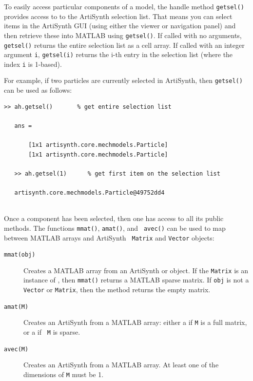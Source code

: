 \documentclass{article}
\begin{document}
To easily access particular components of a model, the handle method
{\tt getsel()} provides access to to the ArtiSynth selection
list. That means you can select items in the ArtiSynth GUI (using
either the viewer or navigation panel) and then retrieve these into
MATLAB using {\tt getsel()}. If called with no arguments, {\tt
getsel()} returns the entire selection list as a cell array.  If
called with an integer argument {\tt i}, {\tt getsel(i)} returns the
i-th entry in the selection list (where the index {\tt i} is 1-based).

For example, if two particles are currently selected in ArtiSynth, then
{\tt getsel()} can be used as follows:
%
\begin{lstlisting}[]
   >> ah.getsel()       % get entire selection list
   
   ans = 

       [1x1 artisynth.core.mechmodels.Particle]
       [1x1 artisynth.core.mechmodels.Particle]

   >> ah.getsel(1)      % get first item on the selection list

   artisynth.core.mechmodels.Particle@49752dd4
   
\end{lstlisting}
%
Once a component has been selected, then one has access to all its
public methods. The functions {\tt mmat()}, {\tt amat()}, and {\tt
avec()} can be used to map between MATLAB arrays and ArtiSynth {\tt
Matrix} and {\tt Vector} objects:

\begin{description}

\item[{\tt mmat(obj)} ] \mbox{}

Creates a MATLAB array from an ArtiSynth 
 or 
object. If the {\tt Matrix} is an instance of 
, then
{\tt mmat()} returns a MATLAB sparse matrix. If {\tt obj} is not a
{\tt Vector} or {\tt Matrix}, then the method returns the empty
matrix.

\item[{\tt amat(M)} ] \mbox{}

Creates an ArtiSynth  from a MATLAB
array: either a  if {\tt M} is a
full matrix, or a  if {\tt
M} is sparse.

\item[{\tt avec(M)} ] \mbox{}

Creates an ArtiSynth  from a
MATLAB array. At least one of the dimensions of {\tt M} must be 1.

\end{description}
\end{document}
